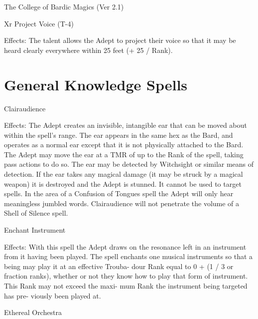 \begin{Chapter}{The College of Bardic Magics (Ver 2.1)}
\begin{tarularx}{\columnwidth}{Xr}
Project Voice (T-4) 

Effects: The talent allows the Adept to project their 
voice  so  that  it  may  be  heard  clearly  everywhere 
within 25 feet (+ 25 / Rank). 

\section{General Knowledge Spells}

\begin{spell}[G-1]{Clairaudience }


Effects: The Adept creates an invisible, intangible ear that can be
moved about within the spell’s range. The ear appears in the same hex
as the Bard, and operates as a normal ear except that it is not
physically attached to the Bard.  The Adept may move the ear at a TMR
of up to the Rank of the spell, taking pass actions to do so. The ear
may be detected by Witchsight or similar means of detection.  If the
ear takes any magical damage (it may be struck by a magical weapon) it
is destroyed and the Adept is stunned.  It cannot be used to target
spells. In the area of a Confusion of Tongues spell the Adept will
only hear meaningless jumbled words. Clairaudience will not penetrate
the volume of a Shell of Silence spell.
\end{spell}

\begin{spell}[G-2]{Enchant Instrument }

Effects:  With  this  spell  the  Adept  draws  on  the 
resonance left in an instrument from it having been 
played. The spell enchants one musical instruments 
so that a being may play it at an effective Trouba-
dour  Rank  equal  to  0  +  (1  /  3  or  fraction  ranks), 
whether or not they know how to play that form of 
instrument.  This  Rank  may  not  exceed  the  maxi-
mum  Rank  the  instrument  being  targeted  has  pre-
viously been played at. 
\end{spell}

\begin{spell}[G-3]{Ethereal Orchestra }


\end{spell}
\end{tarularx}
\end{Chapter}
